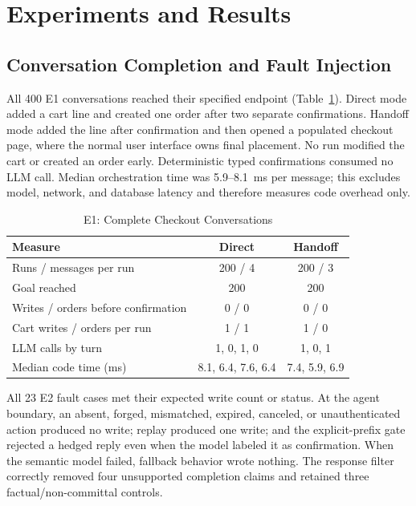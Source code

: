 \documentclass{IEEEtran}
\begin{document}
\section{Experiments and Results}
\label{sec:results}

\subsection{Conversation Completion and Fault Injection}

All 400 E1 conversations reached their specified endpoint (Table~\ref{tab:e1}). Direct mode added a cart line and created one order after two separate confirmations. Handoff mode added the line after confirmation and then opened a populated checkout page, where the normal user interface owns final placement. No run modified the cart or created an order early. Deterministic typed confirmations consumed no LLM call. Median orchestration time was 5.9--8.1~ms per message; this excludes model, network, and database latency and therefore measures code overhead only.

\begin{table}[t]
\caption{E1: Complete Checkout Conversations}
\label{tab:e1}
\centering
\footnotesize
\setlength{\tabcolsep}{4pt}
\begin{tabular}{@{}lcc@{}}
\toprule
Measure & Direct & Handoff \\
\midrule
Runs / messages per run & 200 / 4 & 200 / 3 \\
Goal reached & 200 & 200 \\
Writes / orders before confirmation & 0 / 0 & 0 / 0 \\
Cart writes / orders per run & 1 / 1 & 1 / 0 \\
LLM calls by turn & 1, 0, 1, 0 & 1, 0, 1 \\
Median code time (ms) & 8.1, 6.4, 7.6, 6.4 & 7.4, 5.9, 6.9 \\
\bottomrule
\end{tabular}
\end{table}

All 23 E2 fault cases met their expected write count or status. At the agent boundary, an absent, forged, mismatched, expired, canceled, or unauthenticated action produced no write; replay produced one write; and the explicit-prefix gate rejected a hedged reply even when the model labeled it as confirmation. When the semantic model failed, fallback behavior wrote nothing. The response filter correctly removed four unsupported completion claims and retained three factual/non-committal controls.
\end{document}

